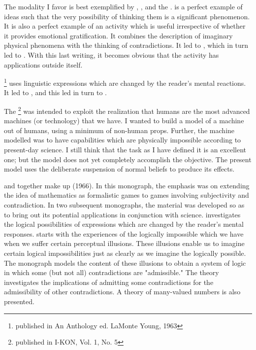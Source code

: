 The modality I favor is best exemplified by ,
, and the . 
 is a perfect example of ideas such that the very 
possibility of thinking them is a significant phenomenon. It is also a perfect example of an 
activity which is useful irrespective of whether it provides emotional 
gratification. It combines the description of imaginary physical phenomena 
with the thinking of contradictions. It led to , which in turn led to .
With this last writing, it becomes obvious that the activity has applications 
outside itself. 

\footnote{published in An Anthology ed. LaMonte Young, 1963}
uses linguistic expressions which are changed by the reader's mental 
reactions. It led to , and this led 
in turn to .

The \footnote{published in I-KON, Vol. 1, No. 5} 
was intended to exploit the realization that humans are the most 
advanced machines (or technology) that we have. I wanted to build a model 
of a machine out of humans, using a minimum of non-human props. Further, 
the machine modelled was to have capabilities which are physically 
impossible according to present-day science. I still think that the task as I 
have defined it is an excellent one; but the model does not yet completely 
accomplish the objective. The present model uses the deliberate suspension 
of normal beliefs to produce its effects. 

 and  together make up  (1966). In 
this monograph, the emphasis was on extending the idea of mathematics as 
formalistic games to games involving subjectivity and contradiction. In two 
subsequent monographs, the material was developed so as to bring out its 
potential applications in conjunction with science. 
 investigates the logical 
possibilities of expressions which are changed by the reader's mental responses.
 starts with the experiences 
of the logically impossible which 
we have when we suffer certain perceptual illusions. These illusions enable us 
to imagine certain logical impossibilities just as clearly as we imagine the 
logically possible. The monograph models the content of these illusions to 
obtain a system of logic in which some (but not all) contradictions are 
"admissible." The theory investigates the implications of admitting some 
contradictions for the admissibility of other contradictions. A theory of 
many-valued numbers is also presented. 


